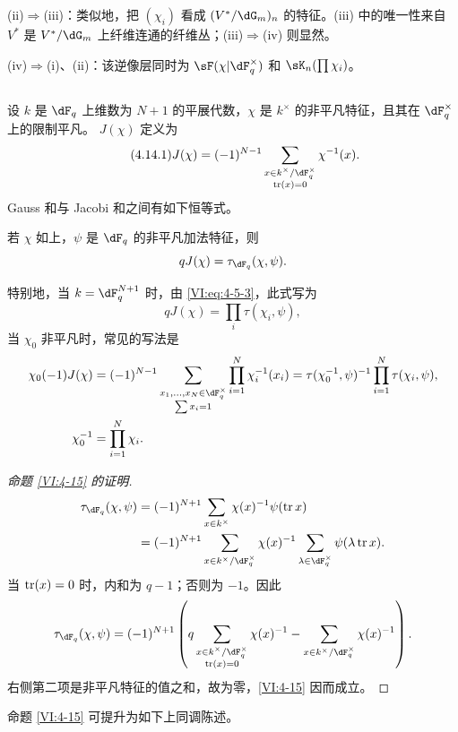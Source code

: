 (ii)$\Rightarrow$(iii)：类似地，把 $(\chi_i)$ 看成 $(V^\ast/\dG_m)_n$ 的特征。(iii) 中的唯一性来自 $V^\ast$ 是 $V^\ast/\dG_m$ 上纤维连通的纤维丛；(iii)$\Rightarrow$(iv) 则显然。

(iv)$\Rightarrow$(i)、(ii)：该逆像层同时为 $\sF(\chi|\dF_q^\times)$ 和 $\sK_n(\prod\chi_i)$。

\subsection{}\label{VI:4-14}
设 $k$ 是 $\dF_q$ 上维数为 $N+1$ 的平展代数，$\chi$ 是 $k^\times$ 的非平凡特征，且其在 $\dF_q^\times$ 上的限制平凡。 $J(\chi)$ 定义为
\begin{equation*}\tag{4.14.1}\label{VI:eq:4-14-1}
J(\chi)=(-1)^{N-1}\sum_{\substack{x\in k^\times/\dF_q^\times\\\tr(x)=0}}\chi^{-1}(x).
\end{equation*}
Gauss 和与 Jacobi 和之间有如下恒等式。

\begin{proposition_}\label{VI:4-15}
若 $\chi$ 如上，$\psi$ 是 $\dF_q$ 的非平凡加法特征，则
\[qJ(\chi)=\tau_{\dF_q}(\chi,\psi).\]
\end{proposition_}
特别地，当 $k=\dF_q^{N+1}$ 时，由 \eqref{VI:eq:4-5-3}，此式写为
\begin{equation*}\tag{4.15.1}\label{VI:eq:4-15-1}
qJ(\chi)=\prod_i\tau(\chi_i,\psi),
\end{equation*}
当 $\chi_0$ 非平凡时，常见的写法是
\begin{align*}
\chi_0(-1)J(\chi)
&=(-1)^{N-1}\sum_{\substack{x_1,\ldots,x_N\in\dF_q^\times\\\sum x_i=1}}\prod_{i=1}^N\chi_i^{-1}(x_i)
=\tau(\chi_0^{-1},\psi)^{-1}\prod_{i=1}^N\tau(\chi_i,\psi),\\
\chi_0^{-1}&=\prod_{i=1}^N\chi_i.
\end{align*}
\begin{proof}[命题 \ref{VI:4-15} 的证明]
\begin{align*}
\tau_{\dF_q}(\chi,\psi)
&=(-1)^{N+1}\sum_{x\in k^\times}\chi(x)^{-1}\psi(\tr x)\\
&=(-1)^{N+1}\sum_{x\in k^\times/\dF_q^\times}\chi(x)^{-1}
 \sum_{\lambda\in\dF_q^\times}\psi(\lambda\tr x).
\end{align*}
当 $\operatorname{tr}(x)=0$ 时，内和为 $q-1$；否则为 $-1$。因此
\[
\tau_{\dF_q}(\chi,\psi)=(-1)^{N+1}\left(
 q\sum_{\substack{x\in k^\times/\dF_q^\times\\\tr(x)=0}}\chi(x)^{-1}
 -\sum_{x\in k^\times/\dF_q^\times}\chi(x)^{-1}\right).
\]
右侧第二项是非平凡特征的值之和，故为零，\ref{VI:4-15} 因而成立。
\end{proof}
命题 \ref{VI:4-15} 可提升为如下上同调陈述。

